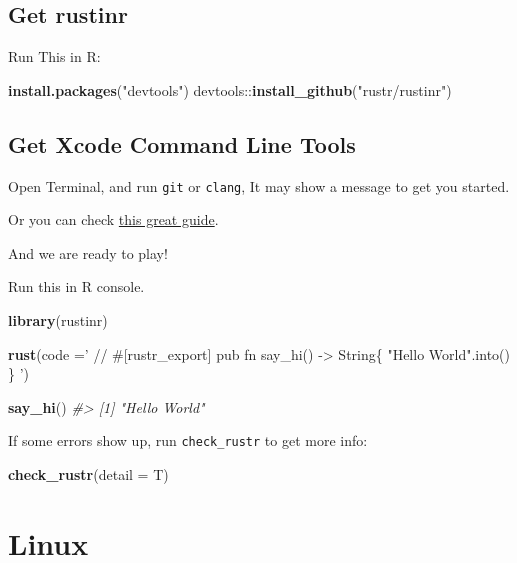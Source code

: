 \documentclass[]{book}
\newenvironment{Shaded}{\begin{snugshade}}{\end{snugshade}}
\newcommand{\KeywordTok}[1]{\textcolor[rgb]{0.13,0.29,0.53}{\textbf{{#1}}}}
\newcommand{\DataTypeTok}[1]{\textcolor[rgb]{0.13,0.29,0.53}{{#1}}}
\newcommand{\StringTok}[1]{\textcolor[rgb]{0.31,0.60,0.02}{{#1}}}
\newcommand{\CommentTok}[1]{\textcolor[rgb]{0.56,0.35,0.01}{\textit{{#1}}}}
\newcommand{\NormalTok}[1]{{#1}}
\begin{document}
\subsection{Get rustinr}\label{get-rustinr-1}

Run This in R:

\begin{Shaded}
\begin{Highlighting}[]
\KeywordTok{install.packages}\NormalTok{(}\StringTok{"devtools"}\NormalTok{)}
\NormalTok{devtools::}\KeywordTok{install_github}\NormalTok{(}\StringTok{"rustr/rustinr"}\NormalTok{)}
\end{Highlighting}
\end{Shaded}

\subsection{Get Xcode Command Line
Tools}\label{get-xcode-command-line-tools}

Open Terminal, and run \texttt{git} or \texttt{clang}, It may show a
message to get you started.

Or you can check
\href{http://rud.is/b/2015/10/20/installing-r-on-os-x/}{this great
guide}.

And we are ready to play!

Run this in R console.

\begin{Shaded}
\begin{Highlighting}[]
\KeywordTok{library}\NormalTok{(rustinr)}

\KeywordTok{rust}\NormalTok{(}\DataTypeTok{code =}\StringTok{'}
\StringTok{// #[rustr_export]}
\StringTok{pub fn say_hi() -> String\{}
\StringTok{    "Hello World".into()}
\StringTok{\}}
\StringTok{'}\NormalTok{)}

\KeywordTok{say_hi}\NormalTok{()}
\CommentTok{#> [1] "Hello World"}
\end{Highlighting}
\end{Shaded}

If some errors show up, run \texttt{check\_rustr} to get more info:

\begin{Shaded}
\begin{Highlighting}[]
\KeywordTok{check_rustr}\NormalTok{(}\DataTypeTok{detail =} \NormalTok{T)}
\end{Highlighting}
\end{Shaded}

\section{Linux}\label{linux}
\end{document}
